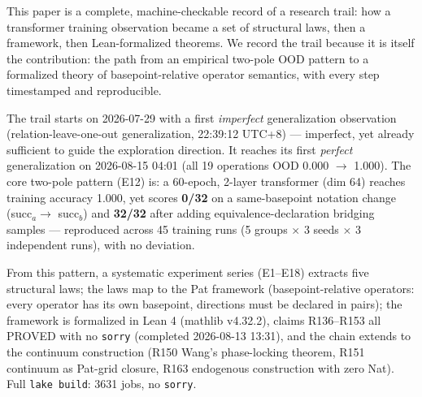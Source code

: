 \documentclass[sigplan,10pt,anonymous,review]{acmart}
\begin{document}
This paper is a complete, machine-checkable record of a research trail: how a
transformer training observation became a set of structural laws, then a
framework, then Lean-formalized theorems. We record the trail because it is
itself the contribution: the path from an empirical two-pole OOD pattern to a
formalized theory of basepoint-relative operator semantics, with every step
timestamped and reproducible.

The trail starts on 2026-07-29 with a first \emph{imperfect} generalization
observation (relation-leave-one-out generalization, 22:39:12 UTC+8) ---
imperfect, yet already sufficient to guide the exploration direction. It
reaches its first \emph{perfect} generalization on 2026-08-15 04:01 (all 19
operations OOD 0.000 $\to$ 1.000). The core two-pole pattern (E12) is: a
60-epoch, 2-layer transformer (dim 64) reaches training accuracy 1.000, yet
scores \textbf{0/32} on a same-basepoint notation change (succ$_a \to$
succ$_b$) and \textbf{32/32} after adding equivalence-declaration bridging
samples --- reproduced across 45 training runs (5 groups $\times$ 3 seeds
$\times$ 3 independent runs), with no deviation.

From this pattern, a systematic experiment series (E1--E18) extracts five
structural laws; the laws map to the Pat framework (basepoint-relative
operators: every operator has its own basepoint, directions must be declared
in pairs); the framework is formalized in Lean 4 (mathlib v4.32.2), claims
R136--R153 all PROVED with no \texttt{sorry} (completed 2026-08-13 13:31), and
the chain extends to the continuum construction (R150 Wang's phase-locking
theorem, R151 continuum as Pat-grid closure, R163 endogenous construction with
zero Nat). Full \texttt{lake build}: 3631 jobs, no \texttt{sorry}.
\end{document}
